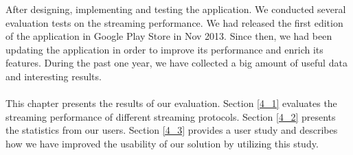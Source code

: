 
After designing, implementing and testing the application. We conducted several
evaluation tests on the streaming performance. We had released the first
edition of the application in Google Play Store in Nov 2013. Since then, we had
been updating the application in order to improve its performance and enrich
its features. During the past one year, we have collected a big amount of
useful data and interesting results. \\
\\
This chapter presents the results of our evaluation. Section \ref{4_1} evaluates
the streaming performance of different streaming protocols. Section \ref{4_2}
presents the statistics from our users. Section \ref{4_3} provides a user study
and describes how we have improved the usability of our solution by utilizing
this study.
